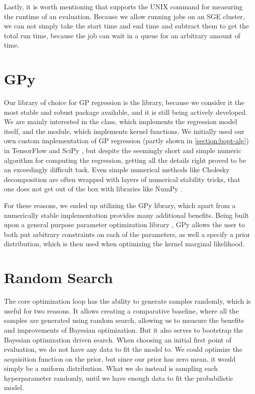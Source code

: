 Lastly, it is worth mentioning that \bopt supports the UNIX  command for measuring the runtime of an evaluation. Because we allow running jobs on an SGE cluster, we can not simply take the start time and end time and subtract them to get the total run time, because the job can wait in a queue for an arbitrary amount of time.

\section{GPy}
\label{section:gpy}

Our library of choice for GP regression is the \cite{gpy2014} library, because we consider it the most stable and robust package available, and it is still being actively developed. We are mainly interested in the  class, which implements the regression model itself, and the  module, which implements kernel functions. We initially used our own custom implementation of GP regression (partly shown in \autoref{section:bopt-alg}) in TensorFlow \citep{tensorflow2015-whitepaper} and SciPy \citep{scipy}, but despite the seemingly short and simple numeric algorithm for computing the regression, getting all the details right proved to be an exceedingly difficult task. Even simple numerical methods like Cholesky decomposition are often wrapped with layers of numerical stability tricks, that one does not get out of the box with libraries like NumPy \citep{numpy}.

For these reasons, we ended up utilizing the GPy library, which apart from a numerically stable implementation provides many additional benefits. Being built upon a general purpose parameter optimization library \cite{paramz}, GPy allows the user to both put arbitrary constraints on each of the parameters, as well a specify a prior distribution, which is then used when optimizing the kernel marginal likelihood.

\section{Random Search}

The core optimization loop has the ability to generate samples randomly, which is useful for two reasons. It allows creating a comparative baseline, where all the samples are generated using random search, allowing us to measure the benefits and improvements of Bayesian optimization. But it also serves to bootstrap the Bayesian optimization driven search. When choosing an initial first point of evaluation, we do not have any data to fit the model to. We could optimize the acquisition function on the prior, but since our prior has zero mean, it would simply be a uniform distribution. What we do instead is sampling each hyperparameter randomly, until we have enough data to fit the probabilistic model.


